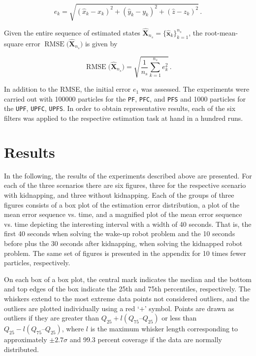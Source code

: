\begin{equation}\label{eq:lateration}
  e_k = \sqrt{(\hat{x}_k - x_k)^2 + (\hat{y}_k - y_k)^2 + (\hat{z} - z_k)^2}\,.
\end{equation}

\noindent
Given the entire sequence of estimated states $\hat{\bm{X}}_{n_s} = \{\hat{\bm{x}}_k\}^{n_s}_{k = 1}$, the root-mean-square error $\operatorname{RMSE}\big(\hat{\bm{X}}_{n_s}\big)$ is given by

\begin{equation}
  \operatorname{RMSE}\big(\hat{\bm{X}}_{n_s}\big) = \sqrt{\frac{1}{{n_s}} \sum_{k=1}^{n_s} e_k^2} \,.
\end{equation}

\noindent
In addition to the RMSE, the initial error $e_1$ was assessed. The experiments were carried out with 100000 particles for the \texttt{PF}, \texttt{PFC}, and \texttt{PFS} and 1000 particles for the \texttt{UPF}, \texttt{UPFC}, \texttt{UPFS}. In order to obtain representative results, each of the six filters was applied to the respective estimation task at hand in a hundred runs.



\section{Results}\label{sec:results}

In the following, the results of the experiments described above are presented. For each of the three scenarios there are six figures, three for the respective scenario with kidnapping, and three without kidnapping. Each of the groups of three figures consists of a box plot of the estimation error distribution, a plot of the mean error sequence vs. time, and a magnified plot of the mean error sequence vs. time depicting the interesting interval with a width of 40 seconds. That is, the first 40 seconds when solving the wake-up robot problem and the 10 seconds before plus the 30 seconds after kidnapping, when solving the kidnapped robot problem. The same set of figures is presented in the appendix for 10 times fewer particles, respectively.

On each box of a box plot, the central mark indicates the median and the bottom and top edges of the box indicate the 25th and 75th percentiles, respectively. The whiskers extend to the most extreme data points not considered outliers, and the outliers are plotted individually using a red `$+$' symbol. Points are drawn as outliers if they are greater than $Q_{25} + l (Q_{75} – Q_{25})$ or less than $Q_{25} - l (Q_{75} – Q_{25})$, where $l$ is the maximum whisker length corresponding to approximately $\pm 2.7 \sigma$ and 99.3 percent coverage if the data are normally distributed.

